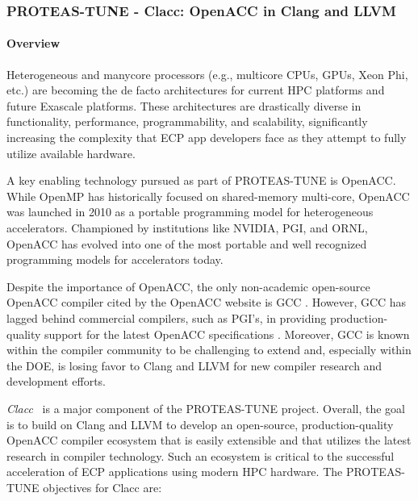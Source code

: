 \subsubsection{ PROTEAS-TUNE - Clacc: OpenACC in Clang and LLVM}\label{s:clacc}

\newcommand{\todo}[1]{\textbf{\textcolor{red}{#1}}}

\paragraph{Overview}

Heterogeneous and manycore processors (e.g., multicore CPUs, GPUs,
Xeon Phi, etc.) are becoming the de facto architectures for current
HPC platforms and future Exascale platforms.  These architectures are
drastically diverse in functionality, performance, programmability,
and scalability, significantly increasing the complexity that ECP app
developers face as they attempt to fully utilize available hardware.

A key enabling technology pursued as part of PROTEAS-TUNE is OpenACC.
While OpenMP has historically focused on shared-memory multi-core,
OpenACC was launched in 2010 as a portable programming model for
heterogeneous accelerators.  Championed by institutions like NVIDIA,
PGI, and ORNL, OpenACC has evolved into one of the most portable and
well recognized programming models for accelerators today.

Despite the importance of OpenACC, the only non-academic open-source OpenACC
compiler cited by the OpenACC website is GCC \cite{openaccOrgTools}.
However, GCC has lagged behind commercial compilers, such as PGI's, in
providing production-quality support for the latest OpenACC specifications
\cite{openACCValidationSuite}.  Moreover, GCC is known within the compiler
community to be challenging to extend and, especially within the DOE, is
losing favor to Clang and LLVM for new compiler research and development
efforts.

\textit{Clacc}~\cite{clacc:2018:denny} is a major component of the
PROTEAS-TUNE project.  Overall, the goal is to build on Clang and LLVM
to develop an open-source, production-quality OpenACC compiler
ecosystem that is easily extensible and that utilizes the latest
research in compiler technology.  Such an ecosystem is critical to the
successful acceleration of ECP applications using modern HPC hardware.
The PROTEAS-TUNE objectives for Clacc are:


